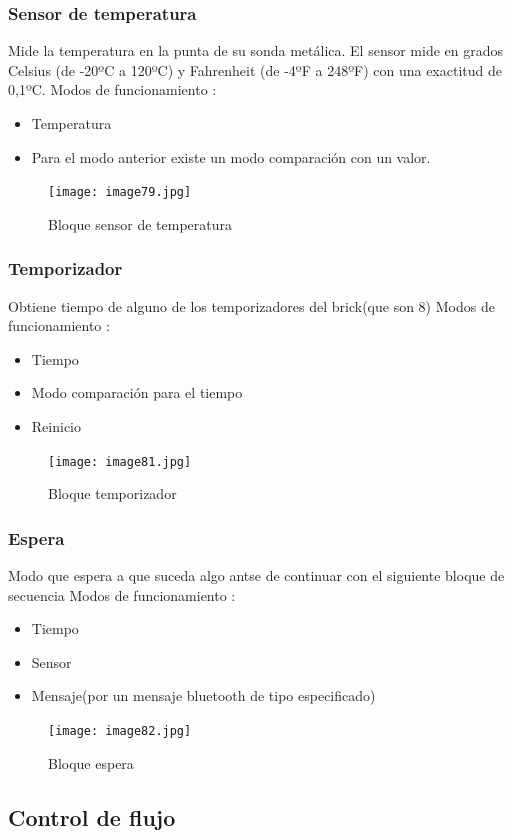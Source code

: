 \documentclass[12pt,a4paper]{article}
\begin{document}
\subsubsection{Sensor de temperatura}
Mide la temperatura en la punta de su sonda
metálica. El sensor mide en grados Celsius (de
-20ºC a 120ºC) y Fahrenheit (de -4ºF a 248ºF)
con una exactitud de 0,1ºC.
Modos de funcionamiento :
\begin{itemize}
\item Temperatura
\item Para el modo anterior existe un modo comparación con un valor.
\end{itemize}
\begin{figure}[H]
	\caption{Bloque sensor de temperatura}
	\texttt{[image: image79.jpg]}
	\centering
\end{figure}
\subsubsection{Temporizador}
Obtiene tiempo de alguno de los temporizadores del brick(que son 8)
Modos de funcionamiento :
\begin{itemize}
\item Tiempo
\item Modo comparación para el tiempo
\item Reinicio
\end{itemize}
\begin{figure}[H]
	\caption{Bloque temporizador}
	\texttt{[image: image81.jpg]}
	\centering
\end{figure}
\subsubsection{Espera}
Modo que espera a que suceda algo antse de continuar con el siguiente bloque de secuencia
Modos de funcionamiento :
\begin{itemize}
\item Tiempo
\item Sensor
\item Mensaje(por un mensaje bluetooth de tipo especificado)
\end{itemize}
\begin{figure}[H]
	\caption{Bloque espera}
	\texttt{[image: image82.jpg]}
	\centering
\end{figure}
\subsection{Control de flujo}
\end{document}
